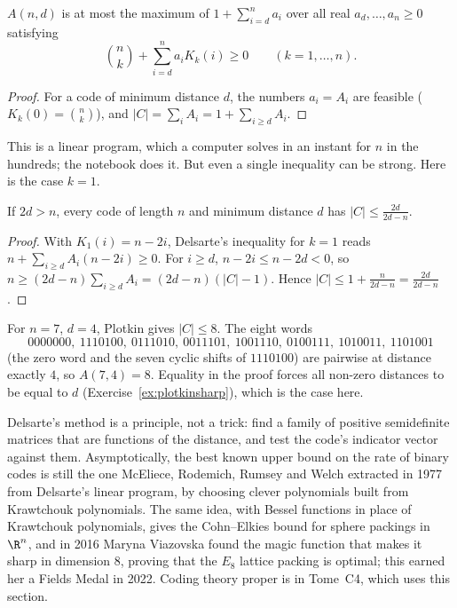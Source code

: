 \begin{corollary}\label{cor:lp}
$A(n,d)$ is at most the maximum of $1+\sum_{i=d}^na_i$ over all real $a_d,\dots,a_n\ge0$ satisfying
\[
\binom nk+\sum_{i=d}^na_iK_k(i)\ge0\qquad(k=1,\dots,n).
\]
\end{corollary}
\begin{proof}
For a code of minimum distance $d$, the numbers $a_i=A_i$ are feasible ($K_k(0)=\binom nk$), and $|C|=\sum_iA_i=1+\sum_{i\ge d}A_i$.
\end{proof}

This is a linear program, which a computer solves in an instant for $n$ in the hundreds; the notebook does it. But even a single
inequality can be strong. Here is the case $k=1$.

\begin{corollary}\label{cor:plotkin}
If $2d>n$, every code of length $n$ and minimum distance $d$ has $|C|\le\frac{2d}{2d-n}$.
\end{corollary}
\begin{proof}
With $K_1(i)=n-2i$, Delsarte's inequality for $k=1$ reads $n+\sum_{i\ge d}A_i(n-2i)\ge0$. For $i\ge d$, $n-2i\le n-2d<0$, so
$n\ge(2d-n)\sum_{i\ge d}A_i=(2d-n)(|C|-1)$. Hence $|C|\le1+\frac n{2d-n}=\frac{2d}{2d-n}$.
\end{proof}

\begin{example}\label{exa:simplex}
For $n=7$, $d=4$, Plotkin gives $|C|\le8$. The eight words
\[
0000000,\ 1110100,\ 0111010,\ 0011101,\ 1001110,\ 0100111,\ 1010011,\ 1101001
\]
(the zero word and the seven cyclic shifts of $1110100$) are pairwise at distance exactly $4$, so $A(7,4)=8$. Equality in the proof
forces all non-zero distances to be equal to $d$ (Exercise~\ref{ex:plotkinsharp}), which is the case here.
\end{example}

\begin{remark}
Delsarte's method is a principle, not a trick: find a family of positive semidefinite matrices that are functions of the
distance, and test the code's indicator vector against them. Asymptotically, the best known upper bound on the rate of binary
codes is still the one McEliece, Rodemich, Rumsey and Welch extracted in 1977 from Delsarte's linear program, by choosing clever
polynomials built from Krawtchouk polynomials. The same idea, with Bessel functions in place of Krawtchouk polynomials, gives the
Cohn--Elkies bound for sphere packings in $\R^n$, and in 2016 Maryna Viazovska found the magic function that makes it sharp in
dimension $8$, proving that the $E_8$ lattice packing is optimal; this earned her a Fields Medal in 2022. Coding theory proper
is in Tome~C4, which uses this section.
\end{remark}

